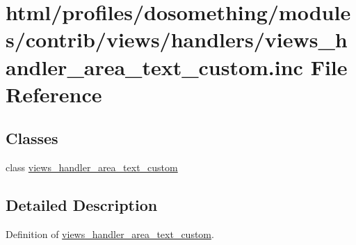 \hypertarget{views__handler__area__text__custom_8inc}{
\section{html/profiles/dosomething/modules/contrib/views/handlers/views\_\-handler\_\-area\_\-text\_\-custom.inc File Reference}
\label{views__handler__area__text__custom_8inc}
}
\subsection*{Classes}
\begin{DoxyCompactItemize}
\item 
class \hyperlink{classviews__handler__area__text__custom}{views\_\-handler\_\-area\_\-text\_\-custom}
\end{DoxyCompactItemize}


\subsection{Detailed Description}
Definition of \hyperlink{classviews__handler__area__text__custom}{views\_\-handler\_\-area\_\-text\_\-custom}. 